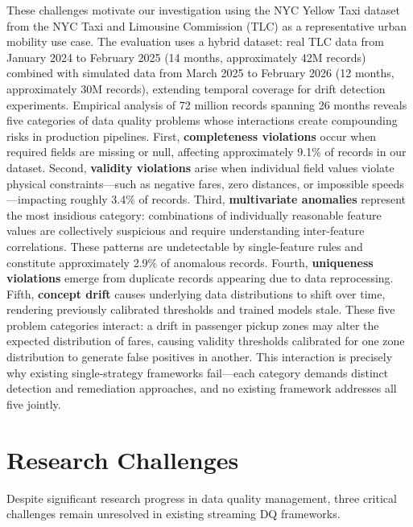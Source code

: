 These challenges motivate our investigation using the NYC Yellow Taxi dataset from the NYC Taxi and Limousine Commission (TLC) as a representative urban mobility use case. The evaluation uses a hybrid dataset: real TLC data from January 2024 to February 2025 (14 months, approximately 42M records) combined with simulated data from March 2025 to February 2026 (12 months, approximately 30M records), extending temporal coverage for drift detection experiments. Empirical analysis of 72 million records spanning 26 months reveals five categories of data quality problems whose interactions create compounding risks in production pipelines. First, \textbf{completeness violations} occur when required fields are missing or null, affecting approximately 9.1\% of records in our dataset. Second, \textbf{validity violations} arise when individual field values violate physical constraints---such as negative fares, zero distances, or impossible speeds---impacting roughly 3.4\% of records. Third, \textbf{multivariate anomalies} represent the most insidious category: combinations of individually reasonable feature values are collectively suspicious and require understanding inter-feature correlations. These patterns are undetectable by single-feature rules and constitute approximately 2.9\% of anomalous records. Fourth, \textbf{uniqueness violations} emerge from duplicate records appearing due to data reprocessing. Fifth, \textbf{concept drift} causes underlying data distributions to shift over time, rendering previously calibrated thresholds and trained models stale. These five problem categories interact: a drift in passenger pickup zones may alter the expected distribution of fares, causing validity thresholds calibrated for one zone distribution to generate false positives in another. This interaction is precisely why existing single-strategy frameworks fail---each category demands distinct detection and remediation approaches, and no existing framework addresses all five jointly.

\section{Research Challenges}
Despite significant research progress in data quality management, three critical challenges remain unresolved in existing streaming DQ frameworks.

